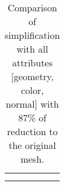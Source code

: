 \begin{center}
  	\begin{table}[H]
  	\begin{center}
  	\begin{tabular}{cc}
	\begin{subfigure}{0.8\textwidth}\centering\includegraphics
		[width=1\columnwidth]{desk_2}\caption{Original}\label{original_100_ref}\end{subfigure}\\
	\begin{subfigure}{0.8\textwidth}\centering\includegraphics
		[width=1\columnwidth]{desk}\caption{Color, geometry and normal simplification}\label{original_70_ref}\end{subfigure}\\
	\end{tabular}
	\caption{Comparison of simplification with all attributes [geometry, color, normal] with 87\% of reduction to the original mesh.}
  	\label{tab:desk}
  	\end{center}
	\end{table}
\end{center}


